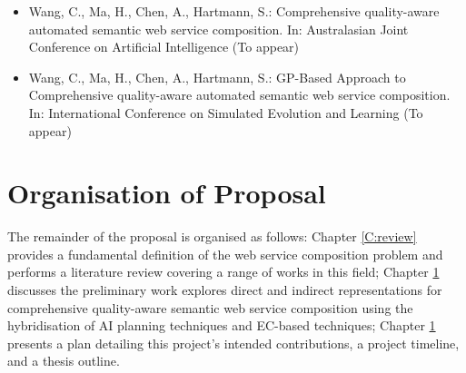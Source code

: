 \begin{itemize}
 \item Wang, C., Ma, H., Chen, A., Hartmann, S.: Comprehensive quality-aware automated semantic web service composition. In: Australasian Joint Conference on Artificial Intelligence (To appear)
 \item Wang, C., Ma, H., Chen, A., Hartmann, S.: GP-Based Approach to Comprehensive quality-aware automated semantic web service composition. In: International Conference on Simulated Evolution and Learning (To appear)
\end{itemize}


\section{Organisation of Proposal}The remainder of the proposal is organised as follows: Chapter \ref{C:review} provides a fundamental definition of the web service composition problem and performs a literature review covering a range of works in this field; Chapter \ref{} discusses the preliminary work explores direct and indirect representations for comprehensive quality-aware semantic web service composition using the hybridisation of AI planning techniques and EC-based techniques; Chapter \ref{} presents a plan detailing this project's intended contributions, a project timeline, and a thesis outline.
